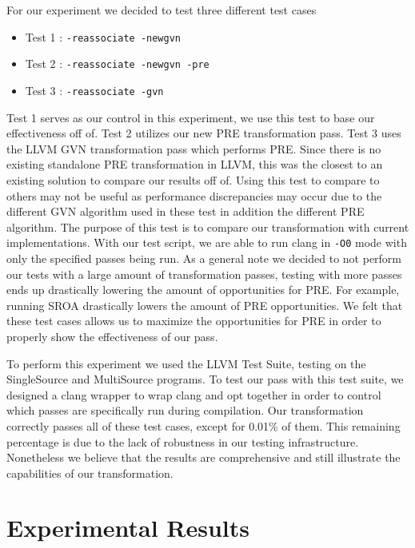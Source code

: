\documentclass[onecolumn,10pt]{journal}
\begin{document}
For our experiment we decided to test three different test cases

\begin{itemize}
\item Test 1 : \texttt{-reassociate -newgvn} 
\item Test 2 : \texttt{-reassociate -newgvn -pre}
\item Test 3 : \texttt{-reassociate -gvn}
\end{itemize}

Test 1 serves as our control in this experiment, we use this test to base our effectiveness off of. Test 2 utilizes our new PRE transformation pass. Test 3 uses the LLVM GVN transformation pass which performs PRE. Since there is no existing standalone PRE transformation in LLVM, this was the closest to an existing solution to compare our results off of. Using this test to compare to others may not be useful as performance discrepancies may occur due to the different GVN algorithm used in these test in addition the different PRE algorithm. The purpose of this test is to compare our transformation with current implementations. With our test script, we are able to run clang in \texttt{-O0} mode with only the specified passes being run. As a general note we decided to not perform our tests with a large amount of transformation passes, testing with more passes ends up drastically lowering the amount of opportunities for PRE. For example, running SROA drastically lowers the amount of PRE opportunities. We felt that these test cases allows us to maximize the opportunities for PRE in order to properly show the effectiveness of our pass.

To perform this experiment we used the LLVM Test Suite, testing on the SingleSource and MultiSource programs. To test our pass with this test suite, we designed a clang wrapper to wrap clang and opt together in order to control which passes are specifically run during compilation. Our transformation correctly passes all of these test cases, except for 0.01\% of them. This remaining percentage is due to the lack of robustness in our testing infrastructure. Nonetheless we believe that the results are comprehensive and still illustrate the capabilities of our transformation.

\section{Experimental Results}
\end{document}
